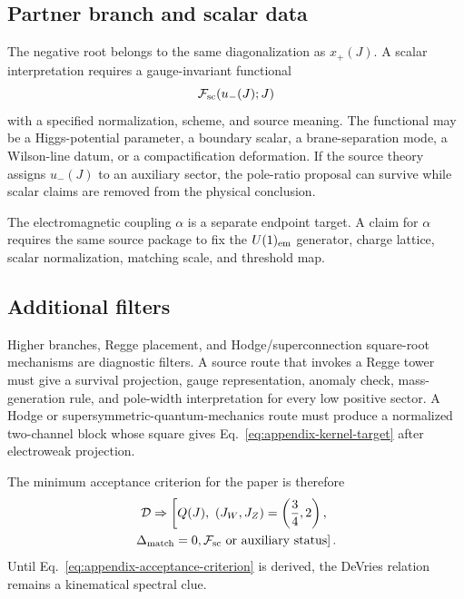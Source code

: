 \subsection{Partner branch and scalar data}
\label{app:target-negative-branch}
\label{app:target-alpha-endpoint}

The negative root belongs to the same diagonalization as \(x_+(J)\).  A scalar
interpretation requires a gauge-invariant functional
\begin{equation}
  \mathcal F_{\rm sc}(u_-(J);J)
  \label{eq:appendix-scalar-functional}
\end{equation}
with a specified normalization, scheme, and source meaning.  The functional may
be a Higgs-potential parameter, a boundary scalar, a brane-separation mode, a
Wilson-line datum, or a compactification deformation.  If the source theory
assigns \(u_-(J)\) to an auxiliary sector, the pole-ratio proposal can survive
while scalar claims are removed from the physical conclusion.

The electromagnetic coupling \(\alpha\) is a separate endpoint target.  A claim
for \(\alpha\) requires the same source package to fix the \(U(1)_{\rm em}\)
generator, charge lattice, scalar normalization, matching scale, and threshold
map.

\subsection{Additional filters}
\label{app:target-branch-scaling}
\label{app:target-regge-intercept-survival}
\label{app:target-susyqm-origin}

Higher branches, Regge placement, and Hodge/superconnection square-root
mechanisms are diagnostic filters.  A source route that invokes a Regge tower
must give a survival projection, gauge representation, anomaly check,
mass-generation rule, and pole-width interpretation for every low positive
sector.  A Hodge or supersymmetric-quantum-mechanics route must produce a
normalized two-channel block whose square gives Eq.~\eqref{eq:appendix-kernel-target}
after electroweak projection.

The minimum acceptance criterion for the paper is therefore
\begin{equation}
  \begin{gathered}
  \mathcal D
  \Rightarrow
  \left[
  Q(J),\ (J_W,J_Z)=\left(\frac34,2\right),
  \right.\\
  \left.
  \Delta_{\rm match}=0,
  \mathcal F_{\rm sc}\ {\rm or\ auxiliary\ status}
  \right].
  \end{gathered}
  \label{eq:appendix-acceptance-criterion}
\end{equation}
Until Eq.~\eqref{eq:appendix-acceptance-criterion} is derived, the DeVries
relation remains a kinematical spectral clue.
